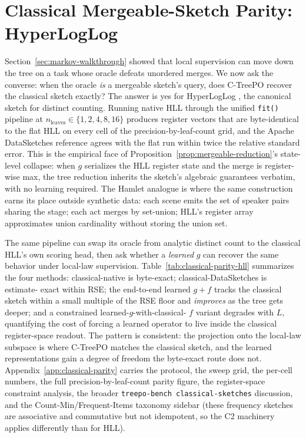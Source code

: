 \section{Classical Mergeable-Sketch Parity: HyperLogLog}\label{sec:hll-parity}

Section~\ref{sec:markov-walkthrough} showed that local supervision can
move down the tree on a task whose oracle defeats unordered merges.
We now ask the converse: when the oracle \emph{is} a mergeable
sketch's query, does C-TreePO recover the classical sketch exactly? The answer is yes for
HyperLogLog \citep{FlajoletEtAl2007,HeuleEtAl2013}, the canonical
sketch for distinct counting. Running native HLL through the unified
\texttt{fit()} pipeline at $n_{\mathrm{leaves}} \in \{1, 2, 4, 8, 16\}$
produces register vectors that are byte-identical to the flat HLL on
every cell of the precision-by-leaf-count grid, and the Apache
DataSketches reference agrees with the flat run within twice the
relative standard error. This is the empirical face of
Proposition~\ref{prop:mergeable-reduction}'s state-level collapse:
when $g$ serializes the HLL register state and the merge is
register-wise max, the tree reduction inherits the sketch's
algebraic guarantees verbatim, with no learning required. The Hamlet
analogue is where the same construction earns its place outside
synthetic data: each scene emits the set of speaker pairs sharing
the stage; each act merges by set-union; HLL's register array
approximates union cardinality without storing the union set.

The same pipeline can swap its oracle from analytic distinct count
to the classical HLL's own scoring head, then ask whether a
\emph{learned} $g$ can recover the same behavior under local-law
supervision. Table~\ref{tab:classical-parity-hll} summarizes the four methods:
classical-native is byte-exact; classical-DataSketches is estimate-
exact within RSE; the end-to-end learned $g{+}f$ tracks the classical
sketch within a small multiple of the RSE floor and \emph{improves}
as the tree gets deeper; and a constrained learned-$g$-with-classical-
$f$ variant degrades with $L$, quantifying the cost of forcing a
learned operator to live inside the classical register-space readout.
The pattern is consistent: the projection onto the local-law subspace
is where C-TreePO matches the classical sketch, and the learned
representations gain a degree of freedom the byte-exact route does
not. Appendix~\ref{app:classical-parity} carries the protocol, the
sweep grid, the per-cell numbers, the full precision-by-leaf-count
parity figure, the register-space constraint analysis, the broader
\texttt{treepo-bench classical-sketches} discussion, and the
Count-Min/Frequent-Items taxonomy sidebar (these frequency sketches
are associative and commutative but not idempotent, so the C2
machinery applies differently than for HLL).


